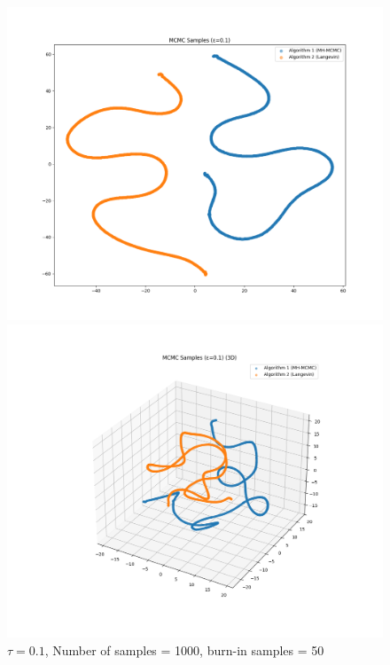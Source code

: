 \documentclass[a4paper,12pt]{article}
\begin{document}
\begin{figure}[H]
  \centering
  \begin{minipage}{0.48\textwidth}
    \includegraphics[width=\linewidth]{TASK-0-1/images/samples_eps0.1_n1000_burn50_tsne_2d.png}
  \end{minipage}
  \hfill
  \begin{minipage}{0.48\textwidth}
    \includegraphics[width=\linewidth]{TASK-0-1/images/samples_eps0.1_n1000_burn50_tsne_3d.png}
  \end{minipage}
  \caption{$\tau = 0.1$, Number of samples = 1000, burn-in samples = 50}
\end{figure}
\end{document}
